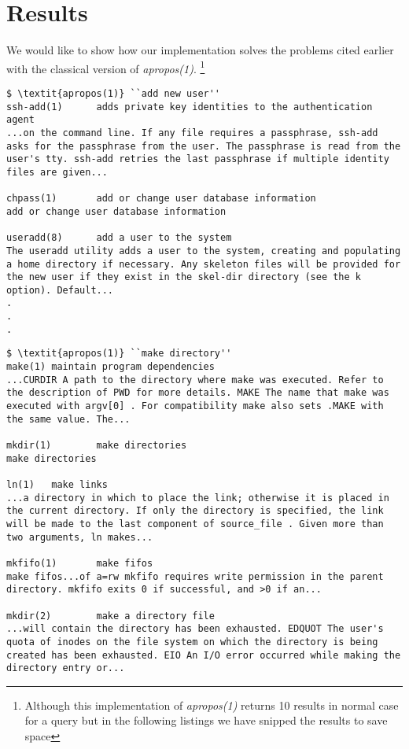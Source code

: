 \documentclass[titlepage, a4paper, 12pt]{article}
\begin{document}
\section{Results}
We would like to show how our implementation solves the problems cited earlier
with the classical version of \textit{apropos(1)}.
\footnote{Although this implementation of \textit{apropos(1)} returns 10 results
in normal case for a query but in the following listings we have snipped the
results to save space
}
\begin{lstlisting}
$ \textit{apropos(1)} ``add new user''
ssh-add(1)      adds private key identities to the authentication agent
...on the command line. If any file requires a passphrase, ssh-add
asks for the passphrase from the user. The passphrase is read from the
user's tty. ssh-add retries the last passphrase if multiple identity
files are given...

chpass(1)       add or change user database information
add or change user database information

useradd(8)      add a user to the system
The useradd utility adds a user to the system, creating and populating
a home directory if necessary. Any skeleton files will be provided for
the new user if they exist in the skel-dir directory (see the k
option). Default...
.
.
.
\end{lstlisting}
\begin{lstlisting}
$ \textit{apropos(1)} ``make directory''
make(1) maintain program dependencies
...CURDIR A path to the directory where make was executed. Refer to
the description of PWD for more details. MAKE The name that make was
executed with argv[0] . For compatibility make also sets .MAKE with
the same value. The...

mkdir(1)        make directories
make directories

ln(1)   make links
...a directory in which to place the link; otherwise it is placed in
the current directory. If only the directory is specified, the link
will be made to the last component of source_file . Given more than
two arguments, ln makes...

mkfifo(1)       make fifos
make fifos...of a=rw mkfifo requires write permission in the parent
directory. mkfifo exits 0 if successful, and >0 if an...

mkdir(2)        make a directory file
...will contain the directory has been exhausted. EDQUOT The user's
quota of inodes on the file system on which the directory is being
created has been exhausted. EIO An I/O error occurred while making the
directory entry or...
\end{lstlisting}
\end{document}
